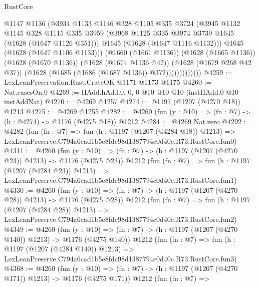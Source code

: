 \begin{lexlean}{RustCore}
\begin{coremodule}
                          @1147
                          @1136
                          (@3934
                            @1133
                            @1146
                            @328
                            @1105
                            @335
                            @3724
                            (@3945
                              @1132
                              @1145
                              @328
                              @1115
                              @335
                              @3959
                              (@3968 @1125 @335 @3974 @3739 @1645 (@1628 (@1647 @1126 @351)))
                              @1645
                              (@1628 (@1647 @1116 @1132)))
                            @1645
                            (@1628 (@1647 @1106 @1133)))
                          (@1660 (@1661 @1136))
                          (@1628 (@1665 @1136))
                          (@1628 (@1670 @1136))
                          (@1628 (@1674 @1136 @42))
                          (@1628 (@1679 @268 @42 @37))
                          (@1628 (@1685 (@1686 (@1687 @1136)) @372)))))))))))))
@4259 := LexLeanPreservation.Rust.CrateOK @1171 @1173 @1175
@4260 := Nat.casesOn.{0}
@4269 := HAdd.hAdd.{0, 0, 0} @10 @10 @10 (instHAdd.{0} @10 instAddNat)
@4270 := @4269 @1257
@4274 := @1197 (@1207 (@4270 @18)) @1213
@4275 := @4269 @1255
@4282 := @4260 (fun (y : @10) => (fn : @7) -> (h : @4274) -> @1176 (@4275 @18)) @1212
@4284 := @4269 Nat.zero
@4292 := @4282
    (fun (fn : @7) =>
    fun (h : @1197 (@1207 (@4284 @18)) @1213) =>
    LexLeanPreserve.C794a6cad1b5e8fdc98d1387794c0d40c.R73.RustCore.fun0)
@4311 := @4260
    (fun (y : @10) => (fn : @7) -> (h : @1197 (@1207 (@4270 @23)) @1213) -> @1176 (@4275 @23))
    @1212
    (fun (fn : @7) =>
    fun (h : @1197 (@1207 (@4284 @23)) @1213) =>
    LexLeanPreserve.C794a6cad1b5e8fdc98d1387794c0d40c.R73.RustCore.fun1)
@4330 := @4260
    (fun (y : @10) => (fn : @7) -> (h : @1197 (@1207 (@4270 @28)) @1213) -> @1176 (@4275 @28))
    @1212
    (fun (fn : @7) =>
    fun (h : @1197 (@1207 (@4284 @28)) @1213) =>
    LexLeanPreserve.C794a6cad1b5e8fdc98d1387794c0d40c.R73.RustCore.fun2)
@4349 := @4260
    (fun (y : @10) => (fn : @7) -> (h : @1197 (@1207 (@4270 @140)) @1213) -> @1176 (@4275 @140))
    @1212
    (fun (fn : @7) =>
    fun (h : @1197 (@1207 (@4284 @140)) @1213) =>
    LexLeanPreserve.C794a6cad1b5e8fdc98d1387794c0d40c.R73.RustCore.fun3)
@4368 := @4260
    (fun (y : @10) => (fn : @7) -> (h : @1197 (@1207 (@4270 @171)) @1213) -> @1176 (@4275 @171))
    @1212
    (fun (fn : @7) =>

\end{coremodule}
\end{lexlean}
